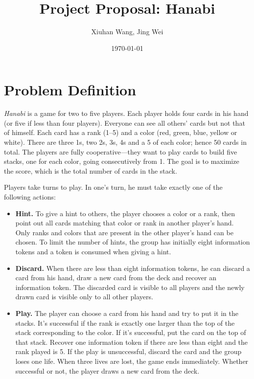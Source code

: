 \documentclass[11pt]{article}
\begin{document}
\title{\bf Project Proposal: Hanabi}
\author{Xiuhan Wang, Jing Wei}
\date{\today}
\maketitle

\section{Problem Definition}

\textsl{Hanabi} is a game for two to five players. Each player holds four cards in his hand (or five if less than four players). Everyone can see all others' cards but not that of himself. Each card has a rank (1--5) and a color (red, green, blue, yellow or white). There are three 1s, two 2s, 3s, 4s and a 5 of each color; hence 50 cards in total. The players are fully cooperative---they want to play cards to build five stacks, one for each color, going consecutively from 1. The goal is to maximize the score, which is the total number of cards in the stack.

Players take turns to play. In one's turn, he must take exactly one of the following actions:

\begin{itemize}
\item \vspace{-1.2ex} \textbf{Hint.} To give a hint to others, the player chooses a color or a rank, then point out all cards matching that color or rank in another player's hand. Only ranks and colors that are present in the other player's hand can be chosen. To limit the number of hints, the group has initially eight information tokens and a token is consumed when giving a hint.
\item \vspace{-1.5ex} \textbf{Discard.} When there are less than eight information tokens, he can discard a card from his hand, draw a new card from the deck and recover an information token. The discarded card is visible to all players and the newly drawn card is visible only to all other players.
\item \vspace{-1.5ex} \textbf{Play.} The player can choose a card from his hand and try to put it in the stacks. It's successful if the rank is exactly one larger than the top of the stack corresponding to the color. If it's successful, put the card on the top of that stack. Recover one information token if there are less than eight and the rank played is 5. If the play is unsuccessful, discard the card and the group loses one life. When three lives are lost, the game ends immediately. Whether successful or not, the player draws a new card from the deck.
\vspace{-1.5ex}
\end{itemize}
\end{document}
